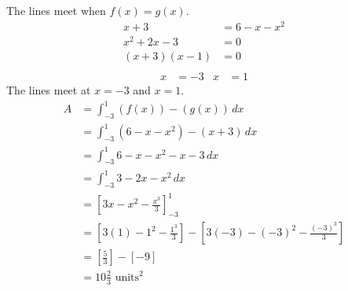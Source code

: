The lines meet when $f(x) = g(x)$.
\begin{align*}
	x+3&=6-x-x^2\\
	x^2+2x-3&=0\\
	(x+3)(x-1)&=0\\
\end{align*}
\begin{align*}
	x&=-3 & x&=1
\end{align*}
The lines meet at $x=-3$ and $x=1$.
\begin{align*}
	A&=\int_{-3}^{1} (f(x)) - (g(x)) \, dx\\
	&= \int_{-3}^{1} (6-x-x^2) - (x+3) \, dx\\
	&= \int_{-3}^{1} 6-x-x^2 -x -3 \, dx\\
	&= \int_{-3}^{1} 3-2x-x^2 \, dx\\
	&= \left[ 3x-x^2-\frac{x^3}{3} \right]_{-3}^{1}\\
	&= \left[ 3(1)-1^2-\frac{1^3}{3} \right] - \left[ 3(-3)-(-3)^2-\frac{(-3)^3}{3} \right]\\
	&= \left[ \frac{5}{3} \right] - \left[ -9 \right]\\
	&= 10 \frac{2}{3} \text{ units}^2
\end{align*}